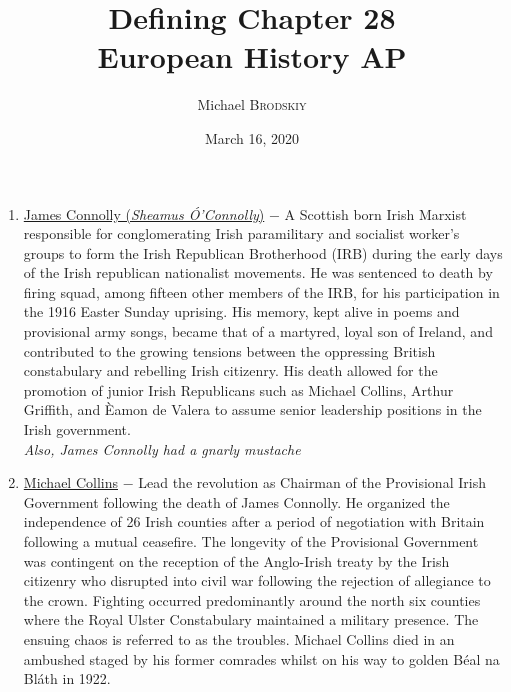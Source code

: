 \documentclass[12pt]{article}
\newcommand{\subtitle}[1]{%
  \posttitle{%
    \par\end{center}
    \begin{center}\large#1\end{center}
    \vskip0.5em}%
}
\begin{document}

\author{Michael \textsc{Brodskiy}}
\title{Defining Chapter 28 \\European History AP}
\subtitle{Mrs Fisher}
\date{March 16, 2020}
\maketitle


\begin{flushleft}
\begin{enumerate}

\item  \underline{James Connolly (\emph{Sheamus \'O'Connolly})} $-$ A Scottish born Irish Marxist responsible for conglomerating Irish paramilitary and socialist worker's groups to form the Irish Republican Brotherhood (IRB) during the early days of the Irish republican nationalist movements. He was sentenced to death by firing squad, among fifteen other members of the IRB, for his participation in the 1916 Easter Sunday uprising. His memory, kept alive in poems and provisional army songs, became that of a martyred, loyal son of Ireland, and contributed to the growing tensions between the oppressing British constabulary and rebelling Irish citizenry. His death allowed for the promotion of junior Irish Republicans such as Michael Collins, Arthur Griffith, and \`Eamon de Valera to assume senior leadership positions in the Irish government. \\\vspace{8pt}\emph{Also, James Connolly had a gnarly mustache}

\item \underline{Michael Collins} $-$ Lead the revolution as Chairman of the Provisional Irish Government following the death of James Connolly. He organized the independence of 26 Irish counties after a period of negotiation with Britain following a mutual ceasefire. The longevity of the Provisional Government was contingent on the reception of the Anglo-Irish treaty by the Irish citizenry who disrupted into civil war following the rejection of allegiance to the crown. Fighting occurred predominantly around the north six counties where the Royal Ulster Constabulary maintained a military presence. The ensuing chaos is referred to as the troubles. Michael Collins died in an ambushed staged by his former comrades whilst on his way to golden B\'eal na Bl\'ath in 1922.


\end{enumerate}
\end{flushleft}
\end{document}
